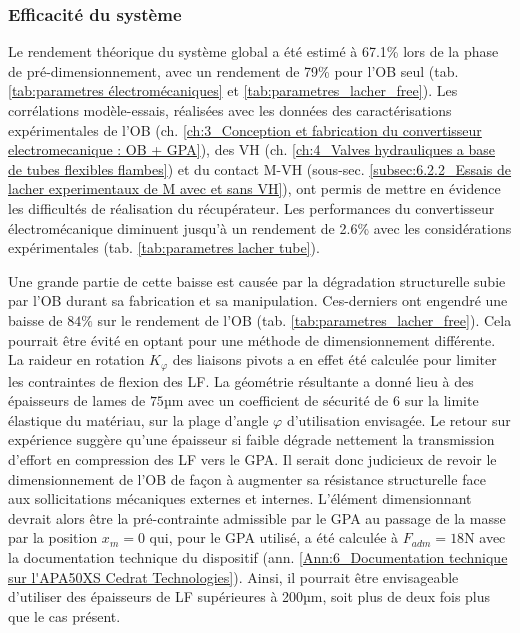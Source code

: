 		\subsubsection{Efficacité du système}
		\label{subsec:6.4.2.b}
Le rendement théorique du système global a été estimé à 67.1\% lors de la phase de pré-dimensionnement, avec un rendement de 79\% pour l'OB seul (tab. \ref{tab:parametres électromécaniques} et \ref{tab:parametres_lacher_free}). Les corrélations modèle-essais, réalisées avec les données des caractérisations expérimentales de l'OB (ch. \ref{ch:3_Conception et fabrication du convertisseur electromecanique : OB + GPA}), des VH (ch. \ref{ch:4_Valves hydrauliques a base de tubes flexibles flambes}) et du contact M-VH (sous-sec. \ref{subsec:6.2.2_Essais de lacher experimentaux de M avec et sans VH}), ont permis de mettre en évidence les difficultés de réalisation du récupérateur. Les performances du convertisseur électromécanique diminuent jusqu'à un rendement de 2.6\% avec les considérations expérimentales (tab. \ref{tab:parametres lacher tube}).

Une grande partie de cette baisse est causée par la dégradation structurelle subie par l'OB durant sa fabrication et sa manipulation. Ces-derniers ont engendré une baisse de $84\%$ sur le rendement de l'OB (tab. \ref{tab:parametres_lacher_free}). Cela pourrait être évité en optant pour une méthode de dimensionnement différente. La raideur en rotation $K_{\varphi}$ des liaisons pivots a en effet été calculée pour limiter les contraintes de flexion des LF. La géométrie résultante a donné lieu à des épaisseurs de lames de $75$µm avec un coefficient de sécurité de 6 sur la limite élastique du matériau, sur la plage d'angle $\varphi$ d'utilisation envisagée. Le retour sur expérience suggère qu'une épaisseur si faible dégrade nettement la transmission d'effort en compression des LF vers le GPA. Il serait donc judicieux de revoir le dimensionnement de l'OB de façon à augmenter sa résistance structurelle face aux sollicitations mécaniques externes et internes. L’élément dimensionnant devrait alors être la pré-contrainte admissible par le GPA au passage de la masse par la position $x_m=0$ qui, pour le GPA utilisé, a été calculée à $F_{adm}=18$N avec la documentation technique du dispositif (ann. \ref{Ann:6_Documentation technique sur l'APA50XS Cedrat Technologies}). Ainsi, il pourrait être envisageable d'utiliser des épaisseurs de LF supérieures à 200µm, soit plus de deux fois plus que le cas présent.

